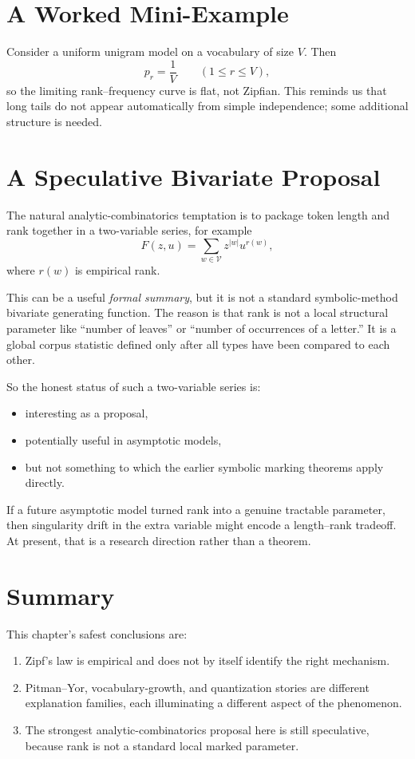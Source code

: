 \section{A Worked Mini-Example}

Consider a uniform unigram model on a vocabulary of size $V$. Then
\[
  p_r = \frac{1}{V}
  \qquad (1 \le r \le V),
\]
so the limiting rank--frequency curve is flat, not Zipfian. This reminds us that long tails do not appear automatically from simple independence; some additional structure is needed.

\section{A Speculative Bivariate Proposal}

The natural analytic-combinatorics temptation is to package token length and rank together in a two-variable series, for example
\[
  F(z,u) = \sum_{w \in \mathcal V} z^{|w|} u^{r(w)},
\]
where $r(w)$ is empirical rank.

This can be a useful \emph{formal summary}, but it is not a standard symbolic-method bivariate generating function. The reason is that rank is not a local structural parameter like ``number of leaves'' or ``number of occurrences of a letter.'' It is a global corpus statistic defined only after all types have been compared to each other.

So the honest status of such a two-variable series is:
\begin{itemize}
  \item interesting as a proposal,
  \item potentially useful in asymptotic models,
  \item but not something to which the earlier symbolic marking theorems apply directly.
\end{itemize}

If a future asymptotic model turned rank into a genuine tractable parameter, then singularity drift in the extra variable might encode a length--rank tradeoff. At present, that is a research direction rather than a theorem.

\section*{Summary}

This chapter's safest conclusions are:
\begin{enumerate}
  \item Zipf's law is empirical and does not by itself identify the right mechanism.
  \item Pitman--Yor, vocabulary-growth, and quantization stories are different explanation families, each illuminating a different aspect of the phenomenon.
  \item The strongest analytic-combinatorics proposal here is still speculative, because rank is not a standard local marked parameter.
\end{enumerate}

